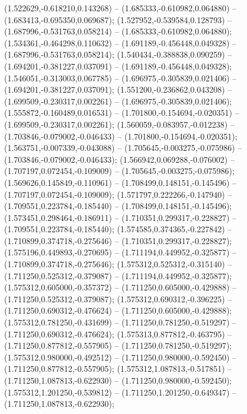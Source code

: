  (1.522629,-0.618210,0.143268) -- (1.685333,-0.610982,0.064880) -- (1.683413,-0.695350,0.069687);
 (1.527952,-0.539584,0.128793) -- (1.687996,-0.531763,0.058214) -- (1.685333,-0.610982,0.064880);
 (1.534361,-0.464298,0.110632) -- (1.691189,-0.456448,0.049328) -- (1.687996,-0.531763,0.058214);
 (1.540434,-0.388838,0.090259) -- (1.694201,-0.381227,0.037091) -- (1.691189,-0.456448,0.049328);
 (1.546051,-0.313003,0.067785) -- (1.696975,-0.305839,0.021406) -- (1.694201,-0.381227,0.037091);
 (1.551200,-0.236862,0.043208) -- (1.699509,-0.230317,0.002261) -- (1.696975,-0.305839,0.021406);
 (1.555872,-0.160489,0.016531) -- (1.701800,-0.154694,-0.020351) -- (1.699509,-0.230317,0.002261);
 (1.560059,-0.083957,-0.012238) -- (1.703846,-0.079002,-0.046433) -- (1.701800,-0.154694,-0.020351);
 (1.563751,-0.007339,-0.043088) -- (1.705645,-0.003275,-0.075986) -- (1.703846,-0.079002,-0.046433);
 (1.566942,0.069288,-0.076002) -- (1.707197,0.072454,-0.109009) -- (1.705645,-0.003275,-0.075986);
 (1.569626,0.145849,-0.110961) -- (1.708499,0.148151,-0.145496) -- (1.707197,0.072454,-0.109009);
 (1.571797,0.222266,-0.147940) -- (1.709551,0.223784,-0.185440) -- (1.708499,0.148151,-0.145496);
 (1.573451,0.298464,-0.186911) -- (1.710351,0.299317,-0.228827) -- (1.709551,0.223784,-0.185440);
 (1.574585,0.374365,-0.227842) -- (1.710899,0.374718,-0.275646) -- (1.710351,0.299317,-0.228827);
 (1.575196,0.449893,-0.270695) -- (1.711194,0.449952,-0.325877) -- (1.710899,0.374718,-0.275646);
 (1.575312,0.525312,-0.315140) -- (1.711250,0.525312,-0.379087) -- (1.711194,0.449952,-0.325877);
 (1.575312,0.605000,-0.357372) -- (1.711250,0.605000,-0.429888) -- (1.711250,0.525312,-0.379087);
 (1.575312,0.690312,-0.396225) -- (1.711250,0.690312,-0.476624) -- (1.711250,0.605000,-0.429888);
 (1.575312,0.781250,-0.431699) -- (1.711250,0.781250,-0.519297) -- (1.711250,0.690312,-0.476624);
 (1.575313,0.877812,-0.463795) -- (1.711250,0.877812,-0.557905) -- (1.711250,0.781250,-0.519297);
 (1.575312,0.980000,-0.492512) -- (1.711250,0.980000,-0.592450) -- (1.711250,0.877812,-0.557905);
 (1.575312,1.087813,-0.517851) -- (1.711250,1.087813,-0.622930) -- (1.711250,0.980000,-0.592450);
 (1.575312,1.201250,-0.539812) -- (1.711250,1.201250,-0.649347) -- (1.711250,1.087813,-0.622930);
